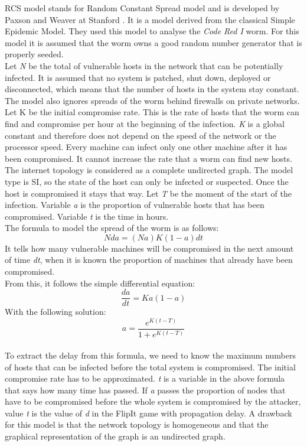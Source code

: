 RCS model stands for Random Constant Spread model and is developed by Paxson and Weaver at Stanford \citep{OwnInternetSI}. It is a model derived from the classical Simple Epidemic Model. They used this model to analyse the \textit{Code Red I} worm. For this model it is assumed that the worm owns a good random number generator that is properly seeded. \\
Let\textit{ N} be the total of vulnerable hosts in the network that can be potentially infected. It is assumed that no system is patched, shut down, deployed or disconnected, which means that the number of hosts in the system stay constant. The model also ignores spreads of the worm behind firewalls on private networks. \\
Let K be the initial compromise rate. This is the rate of hosts that the worm can find and compromise per hour at the beginning of the infection. \textit{K} is a global constant and therefore does not depend on the speed of the network or the processor speed.  Every machine can infect only one other machine after it has been compromised. It cannot increase the rate that a worm can find new hosts. 
The internet topology is considered as a complete undirected graph.  The model type is SI, so the state of the host can only be infected or suspected. Once the host is compromised it stays that way.  
Let \textit{T} be the moment of the start of the infection. Variable \textit{a} is the proportion of vulnerable hosts that has been compromised. Variable \textit{t} is the time in hours. \\

The formula to model the spread of the worm is as follows:
\begin{equation}
N da = (N a)K(1 - a)dt
\end{equation}
It tells how many vulnerable machines will be compromised in the next amount of time \textit{dt}, when it is known the proportion of machines  that already have been compromised.\\

From this, it follows the simple differential equation:
\begin{equation}
\dfrac{d a}{dt} = Ka(1-a)
\end{equation}
With the following solution:
\begin{equation}
a = \dfrac{e^{K(t-T)}}{1+e^{K(t-T)}}
\end{equation}
\\

To extract the delay from this formula, we need to know the maximum numbers of hosts that can be infected before the total system is compromised. The initial compromise rate has to be approximated. \textit{t} is a variable in the above formula that says how many time has passed. If \textit{a} passes the proportion of nodes that have to be compromised before the whole system is compromised by the attacker, value \textit{t}  is the value of \textit{d} in the FlipIt game with propagation delay.
A drawback for this model is that the network topology is homogeneous and that the graphical representation of the graph is an undirected graph.  

